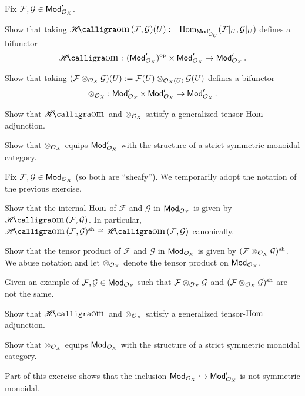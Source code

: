 \documentclass[11pt]{article}
\renewcommand{\F}{\mathcal{F}}
\newcommand{\G}{\mathcal{G}}
\begin{document}
\begin{exercise}
Fix $\F,\G\in\Mod'_{\O_X}$.
\begin{enum}{\alph}
\item Show that taking $\HHom(\F,\G)(U):=\Hom_{\Mod'_{\O_U}}(\F|_U,\G|_U)$ defines a bifunctor 
$$\HHom: (\Mod'_{\O_X})^{\op}\times\Mod'_{\O_X}\to\Mod'_{\O_X}.$$

\item Show that taking $(\F\tensor_{\O_X}\G)(U):=\F(U)\tensor_{\O_X(U)}\G(U)$ defines a bifunctor 
$$\otimes_{\mathcal{O}_X}: \operatorname{\mathsf{Mod}}'_{\mathcal{O}_X}\times\operatorname{\mathsf{Mod}}'_{\mathcal{O}_X}\to\operatorname{\mathsf{Mod}}'_{\mathcal{O}_X}.$$

\item Show that $\HHom$ and $\otimes_{\mathcal{O}_X}$ satisfy a generalized tensor-$\operatorname{Hom}$ adjunction.

\item Show that $\otimes_{\mathcal{O}_X}$ equips $\operatorname{\mathsf{Mod}}'_{\mathcal{O}_X}$ with the structure of a strict symmetric monoidal category.
\end{enum}
\end{exercise}

\begin{exercise}
Fix $\F,\G\in\Mod_{\O_X}$ (so both are ``sheafy''). We temporarily adopt the notation of the previous exercise.
\begin{enum}{\alph}
\item Show that the internal $\operatorname{Hom}$ of $\F$ and $\G$ in $\operatorname{\mathsf{Mod}}_{\mathcal{O}_X}$ is given by $\HHom(\F,\G)$. In particular, $\HHom(\F,\G)^{\sh}\iso\HHom(\F,\G)$ canonically.

\item Show that the tensor product of $\F$ and $\G$ in $\operatorname{\mathsf{Mod}}_{\mathcal{O}_X}$ is given by $(\F\tensor_{\O_X}\G)^{\sh}$. We abuse notation and let $\otimes_{\mathcal{O}_X}$ denote the tensor product on $\operatorname{\mathsf{Mod}}_{\mathcal{O}_X}$.

\item Given an example of $\F,\G\in\Mod_{\O_X}$ such that $\F\tensor_{\O_X}\G$ and $(\F\tensor_{\O_X}\G)^{\sh}$ are not the same.

\item Show that $\HHom$ and $\otimes_{\mathcal{O}_X}$ satisfy a generalized tensor-$\operatorname{Hom}$ adjunction.

\item Show that $\otimes_{\mathcal{O}_X}$ equips $\operatorname{\mathsf{Mod}}_{\mathcal{O}_X}$ with the structure of a strict symmetric monoidal category.
\end{enum}
\end{exercise}

\begin{remark}
Part of this exercise shows that the inclusion $\operatorname{\mathsf{Mod}}_{\mathcal{O}_X}\hookrightarrow\operatorname{\mathsf{Mod}}'_{\mathcal{O}_X}$ is not symmetric monoidal.
\end{remark}
\end{document}
